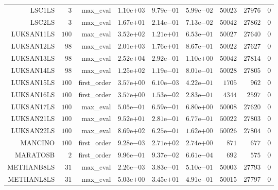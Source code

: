 \begin{longtable}{rrrrrrrrr}
LSC1LS & \(     3\) & max\_eval & \( 1.10\)e\(+03\) & \( 9.79\)e\(-01\) & \( 5.99\)e\(-02\) & \( 50023\) & \( 27976\) & \(     0\) \\
LSC2LS & \(     3\) & max\_eval & \( 1.67\)e\(+01\) & \( 2.14\)e\(-01\) & \( 7.13\)e\(-02\) & \( 50042\) & \( 27862\) & \(     0\) \\
LUKSAN11LS & \(   100\) & max\_eval & \( 3.52\)e\(+02\) & \( 1.21\)e\(+01\) & \( 6.53\)e\(-01\) & \( 50027\) & \( 27640\) & \(     0\) \\
LUKSAN12LS & \(    98\) & max\_eval & \( 2.01\)e\(+03\) & \( 1.76\)e\(+01\) & \( 8.67\)e\(-01\) & \( 50022\) & \( 27627\) & \(     0\) \\
LUKSAN13LS & \(    98\) & max\_eval & \( 2.52\)e\(+04\) & \( 2.92\)e\(-01\) & \( 1.10\)e\(+00\) & \( 50042\) & \( 27814\) & \(     0\) \\
LUKSAN14LS & \(    98\) & max\_eval & \( 1.25\)e\(+02\) & \( 1.19\)e\(-01\) & \( 8.01\)e\(-01\) & \( 50028\) & \( 27805\) & \(     0\) \\
LUKSAN15LS & \(   100\) & first\_order & \( 3.57\)e\(+00\) & \( 6.10\)e\(-03\) & \( 4.22\)e\(-01\) & \(  1705\) & \(   962\) & \(     0\) \\
LUKSAN16LS & \(   100\) & first\_order & \( 3.57\)e\(+00\) & \( 1.53\)e\(-02\) & \( 2.83\)e\(-01\) & \(  4344\) & \(  2597\) & \(     0\) \\
LUKSAN17LS & \(   100\) & max\_eval & \( 5.05\)e\(-01\) & \( 6.59\)e\(-01\) & \( 6.80\)e\(+00\) & \( 50008\) & \( 27620\) & \(     0\) \\
LUKSAN21LS & \(   100\) & max\_eval & \( 9.52\)e\(+01\) & \( 2.81\)e\(-01\) & \( 6.77\)e\(-01\) & \( 50022\) & \( 27803\) & \(     0\) \\
LUKSAN22LS & \(   100\) & max\_eval & \( 8.69\)e\(+02\) & \( 6.25\)e\(-01\) & \( 1.62\)e\(+00\) & \( 50026\) & \( 27804\) & \(     0\) \\
MANCINO & \(   100\) & first\_order & \( 9.28\)e\(-03\) & \( 2.71\)e\(+02\) & \( 2.74\)e\(+00\) & \(   871\) & \(   677\) & \(     0\) \\
MARATOSB & \(     2\) & first\_order & \( 9.96\)e\(-01\) & \( 9.37\)e\(-02\) & \( 6.61\)e\(-04\) & \(   692\) & \(   575\) & \(     0\) \\
METHANB8LS & \(    31\) & max\_eval & \( 2.26\)e\(-03\) & \( 3.83\)e\(-01\) & \( 5.10\)e\(-01\) & \( 50003\) & \( 27793\) & \(     0\) \\
METHANL8LS & \(    31\) & max\_eval & \( 5.03\)e\(+00\) & \( 3.45\)e\(+01\) & \( 4.91\)e\(-01\) & \( 50015\) & \( 27797\) & \(     0\) \\

\end{longtable}

